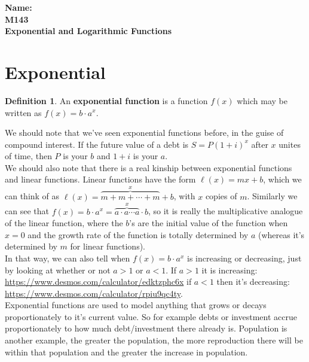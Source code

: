 \documentclass[10pt]{article}
\theoremstyle{definition}
\newtheorem{definition}[equation]{Definition}
\begin{document}
%

{\bf Name:} \hrulefill\hrulefill\hrulefill\\
{\bf M143} \qquad \qquad \\
{\bf Exponential  and Logarithmic Functions}\\ %

\section{Exponential}

\begin{definition}
An \textbf{exponential function} is a function $f(x)$ which may be written as $f(x)=b\cdot a^x$.
\end{definition}

We should note that we've seen exponential functions before, in the guise of compound interest.  If the future value of a debt is $S=P(1+i)^x$ after $x$ unites of time, then $P$ is your $b$ and $1+i$ is your $a$.\\

We should also note that there is a real kinship between exponential functions and linear functions.  Linear functions have the form $\ell(x)=mx+b$, which we can think of as $\ell(x)=\overbrace{m+m+\cdots+m}^x+b$, with $x$ copies of $m$.  Similarly we can see that $f(x)=b\cdot a^x=\overbrace{a\cdot a\cdots a}^x\cdot b$, so it is really the multiplicative analogue of the linear function, where the $b$'s are the initial value of the function when $x=0$ and the growth rate of the function is totally determined by $a$ (whereas it's determined by $m$ for linear functions).\\

In that way, we can also tell when $f(x)=b\cdot a^x$ is increasing or decreasing, just by looking at whether or not $a>1$ or $a<1$.  If $a>1$ it is increasing: \url{https://www.desmos.com/calculator/edktzphc6x} if $a<1$ then it's decreasing: \url{https://www.desmos.com/calculator/rpiu9qc4ty}.\\


Exponential functions are used to model anything that grows or decays proportionately to  it's current value.  So for example debts or investment accrue proportionately to how much debt/investment there already is.  Population is another example, the greater the population, the more reproduction there will be within that population and the greater the increase in population.
\end{document}
